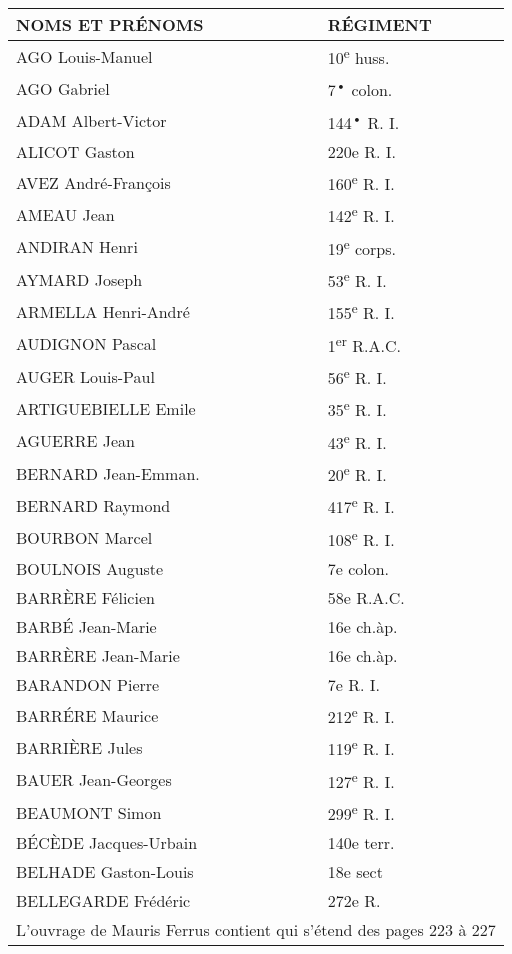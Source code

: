 \documentclass[a4paper,11pt]{book}
\begin{document}
\begin{tabular}{@{}|l|l|}
\toprule
NOMS ET PRÉNOMS & RÉGIMENT\\
\midrule
AGO Louis-Manuel\dotfill & 10\textsuperscript{e} huss. \\
AGO Gabriel\dotfill  & 7\textsuperscript{•} colon.\\
ADAM Albert-Victor\dotfill  & 144\textsuperscript{•} R. I.\\
ALICOT Gaston\dotfill & 220e R. I. \\
AVEZ André-François\dotfill & 160\textsuperscript{e} R. I. \\
AMEAU Jean\dotfill & 142\textsuperscript{e} R. I. \\
ANDIRAN Henri\dotfill & 19\textsuperscript{e} corps. \\
AYMARD Joseph\dotfill & 53\textsuperscript{e} R. I. \\
ARMELLA Henri-André\dotfill & 155\textsuperscript{e} R. I. \\
AUDIGNON Pascal\dotfill & 1\textsuperscript{er} R.A.C. \\
AUGER Louis-Paul\dotfill & 56\textsuperscript{e} R. I. \\
ARTIGUEBIELLE Emile\dotfill & 35\textsuperscript{e} R. I. \\
AGUERRE Jean\dotfill & 43\textsuperscript{e} R. I. \\
BERNARD Jean-Emman.\dotfill & 20\textsuperscript{e} R. I. \\
BERNARD Raymond\dotfill & 417\textsuperscript{e} R. I. \\
BOURBON Marcel\dotfill & 108\textsuperscript{e} R. I. \\
BOULNOIS Auguste\dotfill & 7e colon. \\
BARRÈRE Félicien\dotfill & 58e R.A.C. \\
BARBÉ Jean-Marie\dotfill & 16e ch.àp. \\
BARRÈRE Jean-Marie\dotfill & 16e ch.àp. \\
BARANDON Pierre\dotfill & 7e R. I. \\
BARRÉRE Maurice\dotfill & 212\textsuperscript{e} R. I. \\
BARRIÈRE Jules\dotfill & 119\textsuperscript{e} R. I. \\
BAUER Jean-Georges\dotfill & 127\textsuperscript{e} R. I. \\
BEAUMONT Simon\dotfill & 299\textsuperscript{e} R. I. \\
BÉCÈDE Jacques-Urbain\dotfill & 140e terr. \\
BELHADE Gaston-Louis\dotfill & 18e sect \\
BELLEGARDE Frédéric\dotfill & 272e R. \\
\midrule
\multicolumn{2}{|l|}{L'ouvrage de Mauris Ferrus contient qui s'étend des pages 223 à 227} \\
\bottomrule
\end{tabular}
\end{document}
